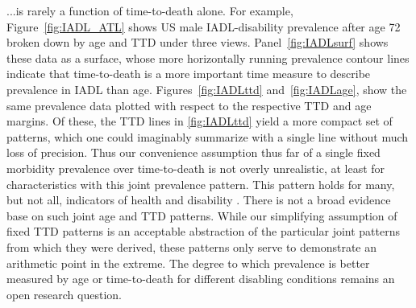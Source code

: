 \documentclass[11pt,oneside,a4paper]{article} %
\begin{document}
...is rarely a function of time-to-death
alone. For example, Figure~\ref{fig:IADL_ATL} shows US male
IADL-disability prevalence after age 72 broken down by age and TTD under three views. Panel~\ref{fig:IADLsurf} shows these data as a surface, whose more horizontally running prevalence contour lines indicate that time-to-death is a more important time measure to describe prevalence in IADL than age. Figures~\ref{fig:IADLttd} and~\ref{fig:IADLage}, show the same prevalence data plotted with respect to the respective TTD and age margins. Of these, the TTD lines in \ref{fig:IADLttd} yield a more compact set of patterns, which one could imaginably summarize with a single line without much loss of precision.  Thus our convenience assumption thus far of a single fixed morbidity prevalence over
time-to-death is not overly unrealistic, at least for characteristics with this joint prevalence pattern. This pattern holds for
many, but not all, indicators of health and disability \citep{riffe2015ttd}. There is not a broad evidence base on such joint age and TTD patterns. While our simplifying assumption of fixed TTD patterns is an acceptable abstraction of the particular joint patterns from which they were derived, these patterns only serve to demonstrate an arithmetic point in the extreme. The degree to which prevalence is better measured by age or time-to-death for different disabling conditions remains an open research question.
\end{document}
